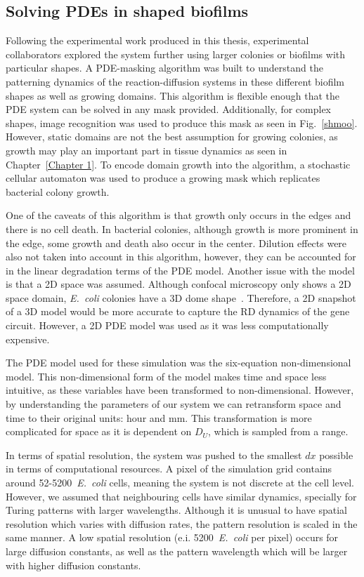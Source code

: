 \subsection{Solving PDEs in shaped biofilms}
Following the experimental work produced in this thesis, experimental collaborators explored the system further using larger colonies or biofilms with particular shapes.
A PDE-masking algorithm was built to understand the patterning dynamics of the reaction-diffusion systems in these different biofilm shapes as well as growing domains.
This algorithm is flexible enough that the PDE system can be solved in any mask provided.
Additionally, for complex shapes, image recognition was used to produce this mask as seen in Fig.~\ref{shmoo}.
However, static domains are not the best assumption for growing colonies, as growth may play an important part in tissue dynamics as seen in Chapter~\ref{Chapter 1}.
To encode domain growth into the algorithm, a stochastic cellular automaton was used to produce a growing mask which replicates bacterial colony growth.

One of the caveats of this algorithm is that growth only occurs in the edges and there is no cell death.
In bacterial colonies, although growth is more prominent in the edge, some growth and death also occur in the center.
Dilution effects were also not taken into account in this algorithm, however, they can be accounted for in the linear degradation terms of the PDE model.
Another issue with the model is that a 2D space was assumed.
Although confocal microscopy only shows a 2D space domain, \textit{E.~coli} colonies have a 3D dome shape~\parencite{wimpenny1979growth}.
Therefore, a 2D snapshot of a 3D model would be more accurate to capture the RD dynamics of the gene circuit.
However, a 2D PDE model was used as it was less computationally expensive.

The PDE model used for these simulation was the six-equation non-dimensional model.
This non-dimensional form of the model makes time and space less intuitive, as these variables have been transformed to non-dimensional.
However, by understanding the parameters of our system we can retransform space and time to their original units: hour and mm.
This transformation is more complicated for space as it is dependent on $D_{U}$, which is sampled from a range.

In terms of spatial resolution, the system was pushed to the smallest $dx$ possible in terms of computational resources.
A pixel of the simulation grid contains around 52-5200~\textit{E.~coli} cells, meaning the system is not discrete at the cell level.
However, we assumed that neighbouring cells have similar dynamics, specially for Turing patterns with larger wavelengths.
Although it is unusual to have spatial resolution which varies with diffusion rates, the pattern resolution is scaled in the same manner.
A low spatial resolution (e.i. 5200~\textit{E.~coli} per pixel) occurs for large diffusion constants, as well as the pattern wavelength which will be larger with higher diffusion constants.

